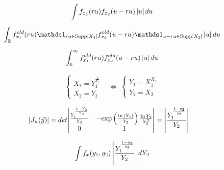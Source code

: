 \documentclass[12pt]{article}
\begin{document}
\begin{enumerate}

\begin{align*}
    \int f_{x_1}(ru)f_{x_2}(u-ru)\left|u\right|du
\end{align*}


\begin{align*}
    \int_{\reals} f_{x_1}^{old}(ru) \indic{ru \in \support{X_1}} f_{x_2}^{old}(u-ru)  \indic{u-ru \in \support{X_2}} \abss{u} du 
\end{align*}


\begin{align*}
        \int_{0}^{\infty} f_{x_1}^{old}(ru) f_{x_2}^{old}(u - ru)\left|u\right| du
\end{align*}



\begin{align*}
    \begin{cases}
        X_1 = Y_1^{\frac{1}{Y_2}} \\ 
        X_2 = Y_2
    \end{cases}
    &\Leftrightarrow~
    \begin{cases}
        Y_1 = X_1^{X_2} \\
        Y_2 = X_2
    \end{cases} 
\end{align*}

\begin{align*}
    \left|J_n(\vec{y})\right| &= det{\begin{vmatrix}\frac{Y_1^{\frac{1-Y_2}{Y_2}}}{Y_2}&-\mathrm{exp}\left(\frac{\ln{(Y_1)}}{Y_2}\right) \frac{\ln{Y_2}}{Y_2^2}\\
                      0&1\end{vmatrix}} =\left|\frac{Y_1^{\frac{1-y_2}{y_2}}}{Y_2}\right|
\end{align*}

\begin{align*}
    \int f_x(y_1, y_2) \left|\frac{Y_1^{\frac{1-y_2}{y_2}}}{Y_2}\right| dY_2 
\end{align*}


\end{enumerate}
\end{document}
